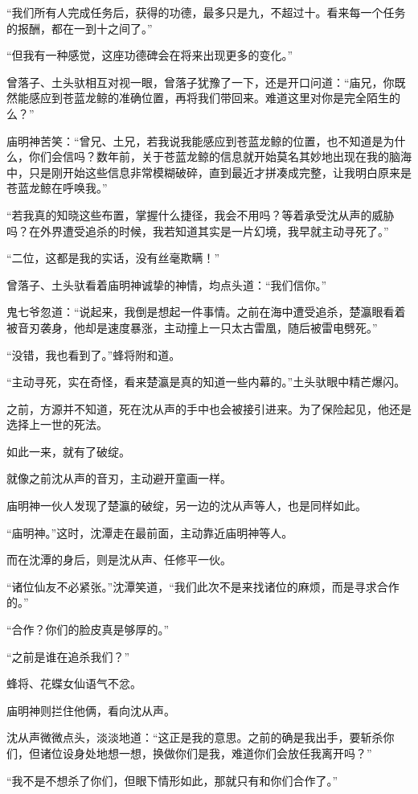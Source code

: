 \begin{this_body}
“我们所有人完成任务后，获得的功德，最多只是九，不超过十。看来每一个任务的报酬，都在一到十之间了。”

“但我有一种感觉，这座功德碑会在将来出现更多的变化。”

曾落子、土头驮相互对视一眼，曾落子犹豫了一下，还是开口问道：“庙兄，你既然能感应到苍蓝龙鲸的准确位置，再将我们带回来。难道这里对你是完全陌生的么？”

庙明神苦笑：“曾兄、土兄，若我说我能感应到苍蓝龙鲸的位置，也不知道是为什么，你们会信吗？数年前，关于苍蓝龙鲸的信息就开始莫名其妙地出现在我的脑海中，只是刚开始这些信息非常模糊破碎，直到最近才拼凑成完整，让我明白原来是苍蓝龙鲸在呼唤我。”

“若我真的知晓这些布置，掌握什么捷径，我会不用吗？等着承受沈从声的威胁吗？在外界遭受追杀的时候，我若知道其实是一片幻境，我早就主动寻死了。”

“二位，这都是我的实话，没有丝毫欺瞒！”

曾落子、土头驮看着庙明神诚挚的神情，均点头道：“我们信你。”

鬼七爷忽道：“说起来，我倒是想起一件事情。之前在海中遭受追杀，楚瀛眼看着被音刃袭身，他却是速度暴涨，主动撞上一只太古雷凰，随后被雷电劈死。”

“没错，我也看到了。”蜂将附和道。

“主动寻死，实在奇怪，看来楚瀛是真的知道一些内幕的。”土头驮眼中精芒爆闪。

之前，方源并不知道，死在沈从声的手中也会被接引进来。为了保险起见，他还是选择上一世的死法。

如此一来，就有了破绽。

就像之前沈从声的音刃，主动避开童画一样。

庙明神一伙人发现了楚瀛的破绽，另一边的沈从声等人，也是同样如此。

“庙明神。”这时，沈潭走在最前面，主动靠近庙明神等人。

而在沈潭的身后，则是沈从声、任修平一伙。

“诸位仙友不必紧张。”沈潭笑道，“我们此次不是来找诸位的麻烦，而是寻求合作的。”

“合作？你们的脸皮真是够厚的。”

“之前是谁在追杀我们？”

蜂将、花蝶女仙语气不忿。

庙明神则拦住他俩，看向沈从声。

沈从声微微点头，淡淡地道：“这正是我的意思。之前的确是我出手，要斩杀你们，但诸位设身处地想一想，换做你们是我，难道你们会放任我离开吗？”

“我不是不想杀了你们，但眼下情形如此，那就只有和你们合作了。”


\end{this_body}
